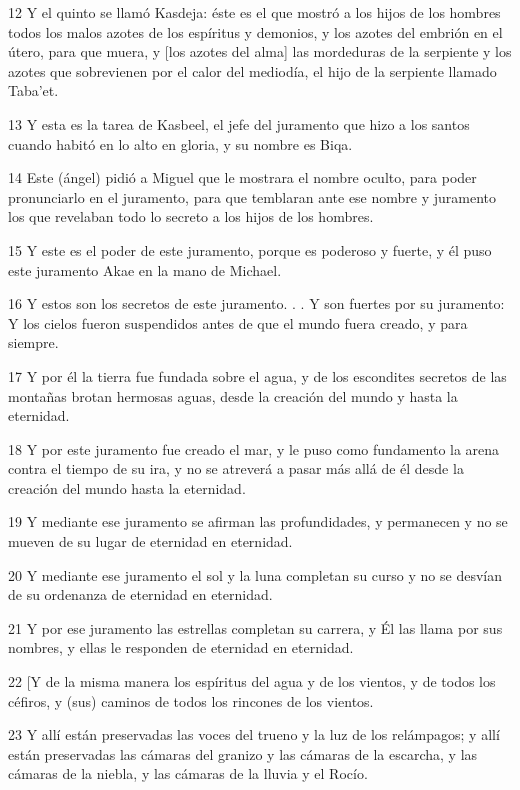 \par 12 Y el quinto se llamó Kasdeja: éste es el que mostró a los hijos de los hombres todos los malos azotes de los espíritus y demonios, y los azotes del embrión en el útero, para que muera, y [los azotes del alma] las mordeduras de la serpiente y los azotes que sobrevienen por el calor del mediodía, el hijo de la serpiente llamado Taba'et.
\par 13 Y esta es la tarea de Kasbeel, el jefe del juramento que hizo a los santos cuando habitó en lo alto en gloria, y su nombre es Biqa.
\par 14 Este (ángel) pidió a Miguel que le mostrara el nombre oculto, para poder pronunciarlo en el juramento, para que temblaran ante ese nombre y juramento los que revelaban todo lo secreto a los hijos de los hombres.
\par 15 Y este es el poder de este juramento, porque es poderoso y fuerte, y él puso este juramento Akae en la mano de Michael.
\par 16 Y estos son los secretos de este juramento. . . Y son fuertes por su juramento: Y los cielos fueron suspendidos antes de que el mundo fuera creado, y para siempre.
\par 17 Y por él la tierra fue fundada sobre el agua, y de los escondites secretos de las montañas brotan hermosas aguas, desde la creación del mundo y hasta la eternidad.
\par 18 Y por este juramento fue creado el mar, y le puso como fundamento la arena contra el tiempo de su ira, y no se atreverá a pasar más allá de él desde la creación del mundo hasta la eternidad.
\par 19 Y mediante ese juramento se afirman las profundidades, y permanecen y no se mueven de su lugar de eternidad en eternidad.
\par 20 Y mediante ese juramento el sol y la luna completan su curso y no se desvían de su ordenanza de eternidad en eternidad.
\par 21 Y por ese juramento las estrellas completan su carrera, y Él las llama por sus nombres, y ellas le responden de eternidad en eternidad.
\par 22 [Y de la misma manera los espíritus del agua y de los vientos, y de todos los céfiros, y (sus) caminos de todos los rincones de los vientos.
\par 23 Y allí están preservadas las voces del trueno y la luz de los relámpagos; y allí están preservadas las cámaras del granizo y las cámaras de la escarcha, y las cámaras de la niebla, y las cámaras de la lluvia y el Rocío.
